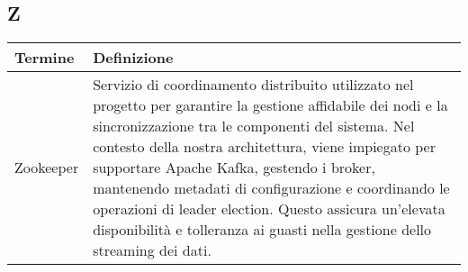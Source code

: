 \documentclass[10pt]{article}
\begin{document}
\subsection{Z} %
\begin{longtable}{|>{\centering\arraybackslash}m{2.5cm}|>{\arraybackslash}m{12.5cm}|}
\hline
\rowcolor[gray]{0.8}
\textbf{Termine} & \textbf{Definizione}\\
\endhead
\hline
 Zookeeper & Servizio di coordinamento distribuito utilizzato nel progetto per garantire la gestione affidabile dei nodi e la sincronizzazione tra le componenti del sistema. Nel contesto della nostra architettura, viene impiegato per supportare Apache Kafka, gestendo i broker, mantenendo metadati di configurazione e coordinando le operazioni di leader election. Questo assicura un'elevata disponibilità e tolleranza ai guasti nella gestione dello streaming dei dati.\\
\hline
\end{longtable}
\end{document}
